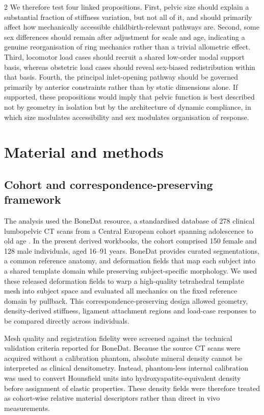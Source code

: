 \documentclass[openacc]{rsproca_new}
\begin{document}
\begin{multicols}{2}
We therefore test four linked propositions. First, pelvic size should explain a substantial fraction of stiffness variation, but not all of it, and should primarily affect how mechanically accessible childbirth-relevant pathways are. Second, some sex differences should remain after adjustment for scale and age, indicating a genuine reorganisation of ring mechanics rather than a trivial allometric effect. Third, locomotor load cases should recruit a shared low-order modal support basis, whereas obstetric load cases should reveal sex-biased redistribution within that basis. Fourth, the principal inlet-opening pathway should be governed primarily by anterior constraints rather than by static dimensions alone. If supported, these propositions would imply that pelvic function is best described not by geometry in isolation but by the architecture of dynamic compliance, in which size modulates accessibility and sex modulates organisation of response.

\section{Material and methods}

\subsection{Cohort and correspondence-preserving framework}

The analysis used the BoneDat resource, a standardised database of 278 clinical lumbopelvic CT scans from a Central European cohort spanning adolescence to old age \cite{HenysKuchar2025}. In the present derived workbooks, the cohort comprised 150 female and 128 male individuals, aged 16--91 years. BoneDat provides curated segmentations, a common reference anatomy, and deformation fields that map each subject into a shared template domain while preserving subject-specific morphology. We used these released deformation fields to warp a high-quality tetrahedral template mesh into subject space and evaluated all mechanics on the fixed reference domain by pullback. This correspondence-preserving design allowed geometry, density-derived stiffness, ligament attachment regions and load-case responses to be compared directly across individuals.

Mesh quality and registration fidelity were screened against the technical validation criteria reported for BoneDat. Because the source CT scans were acquired without a calibration phantom, absolute mineral density cannot be interpreted as clinical densitometry. Instead, phantom-less internal calibration was used to convert Hounsfield units into hydroxyapatite-equivalent density before assignment of elastic properties. These density fields were therefore treated as cohort-wise relative material descriptors rather than direct in vivo measurements.


\end{multicols}
\end{document}
